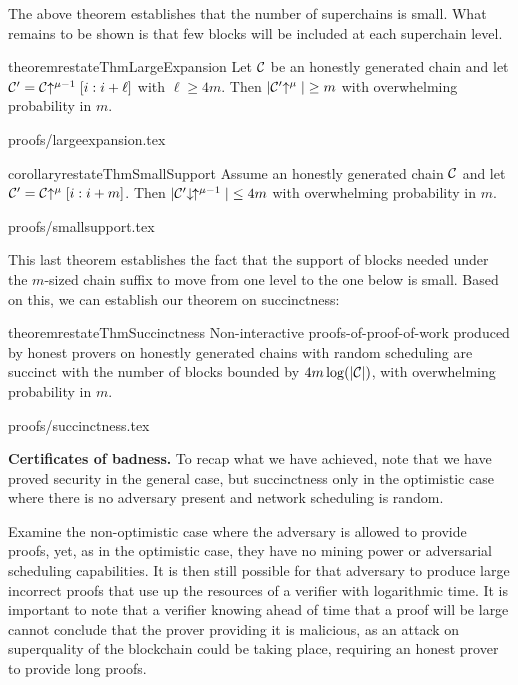 The above theorem establishes that the number of superchains is small. What
remains to be shown is that few blocks will be included at each superchain
level.

\begin{restatable}{theorem}{restateThmLargeExpansion}
    \label{thm.large-expansion}
    Let $\mathcal{C}$ be an honestly generated chain and let
    $\mathcal{C}' = \mathcal{C}\negthickspace\uparrow^{\mu - 1}[i:i + \ell]$ with $\ell \geq 4m$.
    Then $|\mathcal{C}'\negthickspace\uparrow^\mu| \geq m$
    with overwhelming probability in $m$.
\end{restatable}

\ifonecolumn
{proofs/largeexpansion.tex}
\fi

\begin{restatable}{corollary}{restateThmSmallSupport}
    \label{crly.small-support}
    Assume an honestly generated chain $\mathcal{C}$ and let $\mathcal{C}' = \mathcal{C}\negthickspace\uparrow^\mu[i:i + m]$. Then
    $|\mathcal{C}'\negthickspace\downarrow\,\negthickspace\uparrow^{\mu - 1}| \leq 4m$
    with overwhelming probability in $m$.
\end{restatable}

\ifonecolumn
{proofs/smallsupport.tex}
\fi

This last theorem establishes the fact that the support of blocks needed under
the $m$-sized chain suffix to move from one level to the one below is small.
Based on this, we can establish our theorem on succinctness:

\begin{restatable}{theorem}{restateThmSuccinctness}
    \label{thm.succinctness}
    Non-interactive proofs-of-proof-of-work produced by honest provers on
    honestly generated chains with random scheduling are succinct with the
    number of blocks bounded by $4m \log(|\mathcal{C}|)$, with overwhelming
    probability in $m$.
\end{restatable}

\ifonecolumn
{proofs/succinctness.tex}
\else
\fi

\textbf{Certificates of badness.}
To recap what we have achieved, note that we have proved security in the general
case, but succinctness only in the optimistic case where there is no adversary
present and network scheduling is random.

Examine the non-optimistic case where the adversary is allowed to provide
proofs, yet, as in the optimistic case, they have no mining power or adversarial
scheduling capabilities. It is then still possible for that adversary to produce
large incorrect proofs that use up the resources of a verifier with logarithmic
time. It is important to note that a verifier knowing ahead of time that a proof
will be large cannot conclude that the prover providing it is malicious, as an
attack on superquality of the blockchain could be taking place, requiring an
honest prover to provide long proofs.

